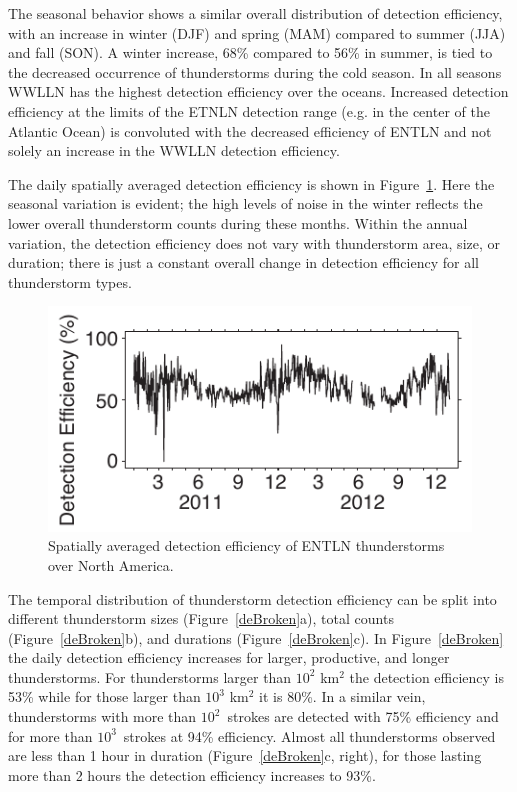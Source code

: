 The seasonal behavior shows a similar overall distribution of detection efficiency, with an increase in winter (DJF) and spring (MAM) compared to summer (JJA) and fall (SON).
A winter increase, 68\% compared to 56\% in summer, is tied to the decreased occurrence of thunderstorms during the cold season.
In all seasons WWLLN has the highest detection efficiency over the oceans.
Increased detection efficiency at the limits of the ETNLN detection range (e.g. in the center of the Atlantic Ocean) is convoluted with the decreased efficiency of ENTLN and not solely an increase in the WWLLN detection efficiency.

The daily spatially averaged detection efficiency is shown in Figure~\ref{deDaily}.
Here the seasonal variation is  evident; the high levels of noise in the winter reflects the lower overall thunderstorm counts during these months.
Within the annual variation, the detection efficiency does not vary with thunderstorm area, size, or duration; there is just a constant overall change in detection efficiency for all thunderstorm types.

\begin{figure}[ht!]
   \centering
   \includegraphics[scale=1]{thunderstorm/Figures/deDaily.pdf}
   \caption{Spatially averaged detection efficiency of ENTLN thunderstorms over North America.}
   \label{deDaily}
\end{figure}

The temporal distribution of thunderstorm detection efficiency can be split into different thunderstorm sizes (Figure~\ref{deBroken}a), total counts (Figure~\ref{deBroken}b), and durations (Figure~\ref{deBroken}c).
In Figure~\ref{deBroken} the daily detection efficiency increases for larger, productive, and longer thunderstorms.
For thunderstorms larger than $10^2$ km$^2$ the detection efficiency is 53\% while for those larger than $10^3$ km$^2$ it is 80\%.
In a similar vein, thunderstorms with more than $10^2$~strokes are detected with 75\% efficiency and for more than $10^3$~strokes at 94\% efficiency.
Almost all thunderstorms observed are less than 1 hour in duration (Figure~\ref{deBroken}c, right), for those lasting more than 2 hours the detection efficiency increases to 93\%.


